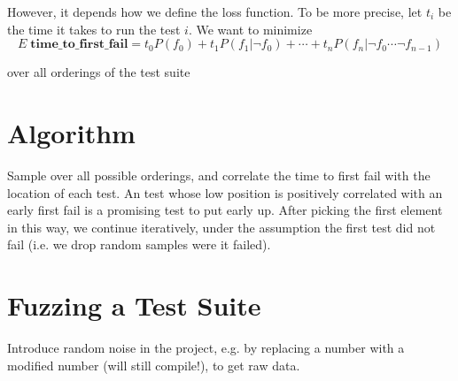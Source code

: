 \documentclass[12pt]{article}
\begin{document}
However, it depends how we define the loss function. To be more precise, let $t_i$ be the time it takes to run the test $i$. We want to minimize
\[ E \; \textbf{time\_to\_first\_fail} = t_0 P(f_0) + t_1 P(f_1 | \neg f_0)  + \cdots + t_n P(f_n | \neg f_0 \cdots \neg f_{n-1})\]

over all orderings of the test suite

\section{Algorithm}

Sample over all possible orderings, and correlate the time to first fail with the location of each test. An test whose low position is positively correlated with an early first fail is a promising test to put early up. After picking the first element in this way, we continue iteratively, under the assumption the first test did not fail (i.e. we drop random samples were it failed).

\section{Fuzzing a Test Suite}

Introduce random noise in the project, e.g. by replacing a number with a modified number (will still compile!), to get raw data.

%
%
\end{document}
